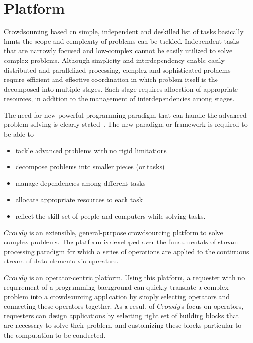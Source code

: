 \chapter{Platform}
\label{chap:platform}

Crowdsourcing based on simple, independent and deskilled list of tasks basically 
limits the scope and complexity of problems can be tackled. Independent tasks that 
are narrowly focused and low-complex cannot be easily utilized to solve complex 
problems. Although simplicity and interdependency enable easily distributed and 
parallelized processing, complex and sophisticated problems require efficient and 
effective coordination in which problem itself is the decomposed into multiple stages. 
Each stage requires allocation of appropriate resources, in addition to the management of interdependencies among stages.

The need for new powerful programming paradigm that can handle the advanced 
problem-solving is clearly stated~\cite{Doan2011, Kittur2013, Bernstein2012}. 
The new paradigm or framework is required to be able to 
\begin{itemize}
	\item tackle advanced problems with no rigid limitations
	\item decompose problems into smaller pieces (or tasks)
	\item manage dependencies among different tasks
	\item allocate appropriate resources to each task
	\item reflect the skill-set of people and computers while solving tasks.
\end{itemize}

$Crowdy$ is an extensible, general-purpose crowdsourcing platform to solve 
complex problems. The platform is developed over the fundamentals of stream 
processing paradigm for which a series of operations are applied to the continuous 
stream of data elements via operators.

$Crowdy$ is an operator-centric platform. Using this platform, a requester with no 
requirement of a programming background can quickly translate a complex problem into 
a crowdsourcing application by simply selecting operators and connecting these operators 
together. As a result of $Crowdy$'s focus on operators, requesters can design applications 
by selecting right set of building blocks that are necessary to solve their problem, 
and customizing these blocks particular to the computation to-be-conducted.

